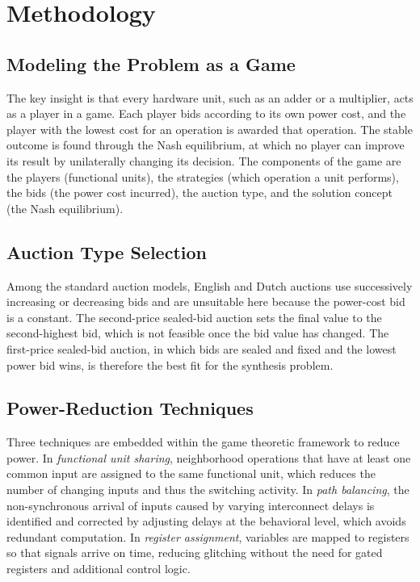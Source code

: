 \documentclass[conference]{IEEEtran}
\begin{document}
\section{Methodology}

\subsection{Modeling the Problem as a Game}
The key insight is that every hardware unit, such as an adder or a
multiplier, acts as a player in a game. Each player bids according to
its own power cost, and the player with the lowest cost for an operation
is awarded that operation. The stable outcome is found through the Nash
equilibrium, at which no player can improve its result by unilaterally
changing its decision. The components of the game are the players
(functional units), the strategies (which operation a unit performs),
the bids (the power cost incurred), the auction type, and the solution
concept (the Nash equilibrium).

\subsection{Auction Type Selection}
Among the standard auction models, English and Dutch auctions use
successively increasing or decreasing bids and are unsuitable here
because the power-cost bid is a constant. The second-price sealed-bid
auction sets the final value to the second-highest bid, which is not
feasible once the bid value has changed. The first-price sealed-bid
auction, in which bids are sealed and fixed and the lowest power bid
wins, is therefore the best fit for the synthesis problem.

\subsection{Power-Reduction Techniques}
Three techniques are embedded within the game theoretic framework to
reduce power. In \emph{functional unit sharing}, neighborhood
operations that have at least one common input are assigned to the same
functional unit, which reduces the number of changing inputs and thus
the switching activity. In \emph{path balancing}, the non-synchronous
arrival of inputs caused by varying interconnect delays is identified
and corrected by adjusting delays at the behavioral level, which avoids
redundant computation. In \emph{register assignment}, variables are
mapped to registers so that signals arrive on time, reducing glitching
without the need for gated registers and additional control logic.
\end{document}
